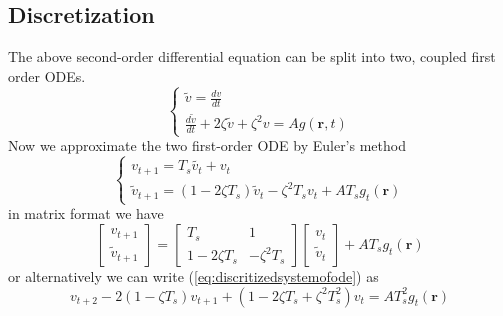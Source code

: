 \documentclass[a4paper,10pt]{article}
\begin{document}
\subsection*{Discretization}
The above second-order differential equation can be split into two, coupled first order ODEs.\\
\begin{equation}\label{eq:systemofode}
\begin{cases}
\tilde{v}=\frac{dv}{dt} \\
\frac{d\tilde{v}}{dt}+2\zeta\tilde{v}+\zeta^2v=Ag\left( \mathbf{r},t \right)
\end{cases}
\end{equation}
Now we approximate the two first-order ODE by Euler's method
\begin{equation}\label{eq:discritizedsystemofode}
\begin{cases}
v_{t+1}=T_s\tilde{v_t}+v_t\\
\tilde{v}_{t+1}=(1-2\zeta T_s)\tilde{v}_t-\zeta^2T_sv_t+AT_sg_t\left( \mathbf{r}\right)
\end{cases}
\end{equation}
in matrix format we have
\begin{equation}
 \begin{bmatrix}v_{t+1} \\ \tilde{v}_{t+1}\end{bmatrix}= \begin{bmatrix} T_s &1\\ 1-2\zeta T_s & -\zeta^2T_s\end{bmatrix}\begin{bmatrix}v_{t} \\ \tilde{v}_{t}\end{bmatrix}+AT_sg_t\left( \mathbf{r}\right)
\end{equation}
or alternatively we can write (\ref{eq:discritizedsystemofode}) as
\begin{equation}\label{eq:DifferenceModel}
 v_{t+2}-2(1-\zeta T_s)v_{t+1}+(1-2\zeta T_s+\zeta^2T_s^2)v_t=AT_s^2g_t\left( \mathbf{r}\right)
\end{equation}
\end{document}
